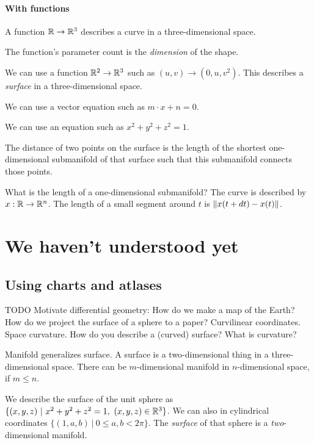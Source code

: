 \paragraph{With functions}

A function \(\mathbb{R} \to \mathbb{R}^3\) describes a curve in a three-dimensional space.

%
%
The function's parameter count is the \emph{dimension} of the shape.

We can use a function \(\mathbb{R}^2 \to \mathbb{R}^3\) such as \( (u,v) \to (0,u,v^2) \).
This describes a \emph{surface} in a three-dimensional space.

We can use a vector equation such as \( m \cdot x + n = 0 \).

We can use an equation such as \( x^2 + y^2 + z^2 = 1 \).

The distance of two points on the surface is the length of the shortest one-dimensional submanifold
of that surface such that this submanifold connects those points.

What is the length of a one-dimensional submanifold?
The curve is described by \( x : \mathbb{R} \to \mathbb{R}^n \).
The length of a small segment around \(t\) is \(\norm{x(t+dt) - x(t)}\).

\section{We haven't understood yet}

\subsection{Using charts and atlases}

TODO
Motivate differential geometry:
How do we make a map of the Earth?
How do we project the surface of a sphere to a paper?
Curvilinear coordinates. Space curvature.
How do you describe a (curved) surface?
What is curvature?

Manifold generalizes surface.
A surface is a two-dimensional thing in a three-dimensional space.
There can be \(m\)-dimensional manifold in \(n\)-dimensional space, if \(m \le n\).

We describe the surface of the unit sphere as \( \{ (x,y,z) ~|~ x^2 + y^2 + z^2 = 1, ~ (x,y,z) \in \mathbb{R}^3 \} \).
We can also in cylindrical coordinates \( \{ (1,a,b) ~|~ 0 \le a,b < 2\pi \} \).
The \emph{surface} of that sphere is a \emph{two}-dimensional manifold.

